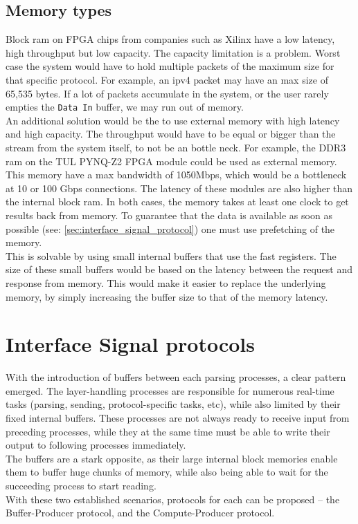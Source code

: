 \subsection{Memory types}  \label{subsec:memory_types}
Block ram on FPGA chips from companies such as Xilinx have a low latency, high
throughput but low capacity.\cite{xilinx_fpga_memory_resources}
The capacity limitation is a problem. Worst case the
system would have to hold multiple packets of the maximum size for that specific
protocol. For example, an \gls{ipv4} packet may have an max size of 65,535
bytes.\cite{RFC0791} If a lot of packets accumulate in the system, or the user
rarely empties the \texttt{Data In} buffer, we may run out of memory.\\
An additional solution would be the to use external memory with high latency
and high capacity. The throughput would have to be equal
or bigger than the stream from the system itself, to not be an bottle
neck. For example, the DDR3 ram on the
TUL PYNQ\texttrademark-Z2\cite{tul_pynq} FPGA module could be used as external memory.
This memory have a max bandwidth of 1050Mbps, which would be a bottleneck
at 10 or 100 Gbps connections. The latency of these modules are also higher
than the internal block ram.
In both cases, the memory takes at least one clock to get results back from
memory. To guarantee that the data is available as soon as possible
(see: \autoref{sec:interface_signal_protocol}) one must use prefetching of the
memory.\\
This is solvable by using small internal buffers that use the fast registers.
The size of these small buffers would be based on the latency between the
request and response from memory. This would make it easier to
replace the underlying memory, by simply increasing the buffer size to that
of the memory latency.


\section{Interface Signal protocols}
\label{sec:interface_signal_protocol}
With the introduction of buffers between each parsing processes, a clear pattern
emerged. The layer-handling processes are responsible for numerous real-time tasks
(parsing, sending, protocol-specific tasks, etc), while also limited by their
fixed internal buffers. These processes are not always ready to receive input
from preceding processes, while they at the same time must be able to write their
output to following processes immediately.\\
The buffers are a stark opposite, as their large internal block memories enable
them to buffer huge chunks of memory, while also being able to wait for the
succeeding process to start reading.\\
With these two established scenarios, protocols for each can be proposed -- the
Buffer-Producer protocol, and the Compute-Producer protocol.

